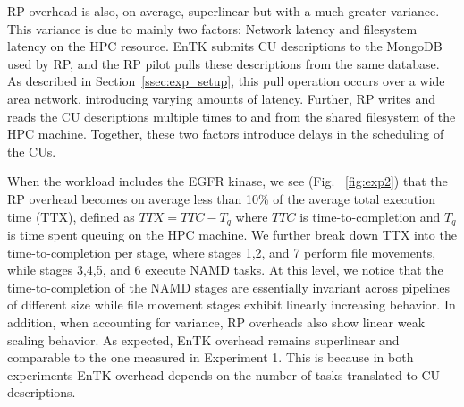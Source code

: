 \documentclass{bmcart}
\def\texttt{[image: ]}
\begin{document}
RP overhead is also, on average, superlinear but with a much greater
variance. This variance is due to mainly two factors: Network latency and
filesystem latency on the HPC resource. EnTK submits CU descriptions to the
MongoDB used by RP, and the RP pilot pulls these descriptions from the same
database. As described in Section~\ref{ssec:exp_setup}, this pull operation
occurs over a wide area network, introducing varying amounts of latency.
Further, RP writes and reads the CU descriptions multiple times to and
from the shared filesystem of the HPC machine. Together, these two factors
introduce delays in the scheduling of the CUs.





When the workload includes the EGFR kinase, we see (Fig. ~\ref{fig:exp2})
that the RP overhead becomes on average less than 10\% of the average total
execution time (TTX), defined as \(TTX = TTC - T_q\) where \(TTC\) is
time-to-completion and \(T_q\) is time spent queuing on the HPC machine. We
further break down TTX into the time-to-completion per stage, where stages
1,2, and 7 perform file movements, while stages 3,4,5, and 6 execute NAMD
tasks. At this level, we notice that the time-to-completion of the NAMD
stages are essentially invariant across pipelines of different size while
file movement stages exhibit linearly increasing behavior. In addition, when
accounting for variance, RP overheads also show linear weak scaling behavior.
As expected, EnTK overhead remains superlinear and comparable to the one
measured in Experiment 1. This is because in both experiments EnTK overhead
depends on the number of tasks translated to CU descriptions.
\end{document}
